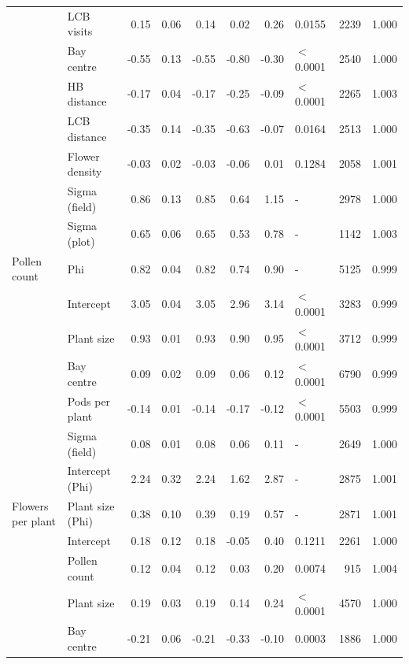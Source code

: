 \documentclass[12pt]{article} %
\begin{document}
\begin{longtable}{l|l|r|r|r|r|r|l|r|r}
\cline{2-10}
 & LCB visits & 0.15 & 0.06 & 0.14 & 0.02 & 0.26 & 0.0155 & 2239 & 1.000\\
\cline{2-10}
 & Bay centre & -0.55 & 0.13 & -0.55 & -0.80 & -0.30 & $<$0.0001 & 2540 & 1.000\\
\cline{2-10}
 & HB distance & -0.17 & 0.04 & -0.17 & -0.25 & -0.09 & $<$0.0001 & 2265 & 1.003\\
\cline{2-10}
 & LCB distance & -0.35 & 0.14 & -0.35 & -0.63 & -0.07 & 0.0164 & 2513 & 1.000\\
\cline{2-10}
 & Flower density & -0.03 & 0.02 & -0.03 & -0.06 & 0.01 & 0.1284 & 2058 & 1.001\\
\cline{2-10}
 & Sigma (field) & 0.86 & 0.13 & 0.85 & 0.64 & 1.15 & - & 2978 & 1.000\\
\cline{2-10}
 & Sigma (plot) & 0.65 & 0.06 & 0.65 & 0.53 & 0.78 & - & 1142 & 1.003\\
\cline{2-10}
\multirow{-10}{*}{\raggedright\arraybackslash Pollen count} & Phi & 0.82 & 0.04 & 0.82 & 0.74 & 0.90 & - & 5125 & 0.999\\
\cline{1-10}
 & Intercept & 3.05 & 0.04 & 3.05 & 2.96 & 3.14 & $<$0.0001 & 3283 & 0.999\\
\cline{2-10}
 & Plant size & 0.93 & 0.01 & 0.93 & 0.90 & 0.95 & $<$0.0001 & 3712 & 0.999\\
\cline{2-10}
 & Bay centre & 0.09 & 0.02 & 0.09 & 0.06 & 0.12 & $<$0.0001 & 6790 & 0.999\\
\cline{2-10}
 & Pods per plant & -0.14 & 0.01 & -0.14 & -0.17 & -0.12 & $<$0.0001 & 5503 & 0.999\\
\cline{2-10}
 & Sigma (field) & 0.08 & 0.01 & 0.08 & 0.06 & 0.11 & - & 2649 & 1.000\\
\cline{2-10}
 & Intercept (Phi) & 2.24 & 0.32 & 2.24 & 1.62 & 2.87 & - & 2875 & 1.001\\
\cline{2-10}
\multirow{-7}{*}{\raggedright\arraybackslash Flowers per plant} & Plant size (Phi) & 0.38 & 0.10 & 0.39 & 0.19 & 0.57 & - & 2871 & 1.001\\
\cline{1-10}
 & Intercept & 0.18 & 0.12 & 0.18 & -0.05 & 0.40 & 0.1211 & 2261 & 1.000\\
\cline{2-10}
 & Pollen count & 0.12 & 0.04 & 0.12 & 0.03 & 0.20 & 0.0074 & 915 & 1.004\\
\cline{2-10}
 & Plant size & 0.19 & 0.03 & 0.19 & 0.14 & 0.24 & $<$0.0001 & 4570 & 1.000\\
\cline{2-10}
 & Bay centre & -0.21 & 0.06 & -0.21 & -0.33 & -0.10 & 0.0003 & 1886 & 1.000\\
\cline{2-10}

\end{longtable}
\end{document}
